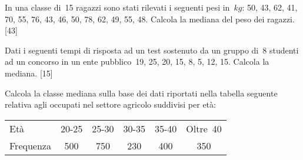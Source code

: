 \begin{esercizio}[\Ast]
\label{ese:A.31}
In una classe di~15 ragazzi sono stati rilevati i seguenti pesi 
in~\(\unit{kg}\):
50, 43, 62, 41, 70, 55, 76, 43, 46, 50, 78, 62, 49, 55, 48.
Calcola la mediana del peso dei ragazzi.
\hfill [43]
\end{esercizio}

\begin{esercizio}[\Ast]
\label{ese:A.32}
Dati i seguenti tempi di risposta ad un test sostenuto da un gruppo di~8 
studenti ad un concorso
in un ente pubblico~19, 25, 20, 15, 8, 5, 12, 15. Calcola la mediana.
\hfill [15]
\end{esercizio}

\begin{esercizio}
\label{ese:A.33}
Calcola la classe mediana sulla base dei dati riportati nella tabella 
seguente relativa agli occupati nel settore agricolo suddivisi per età:
\begin{center}
 \begin{tabular}{l*{5}{c}}
\toprule
Età & 20-25 & 25-30 & 30-35 & 35-40 & Oltre~40\\
Frequenza & 500 & 750 & 230 & 400 & 350\\
\bottomrule
\end{tabular}
\end{center}
\end{esercizio}

